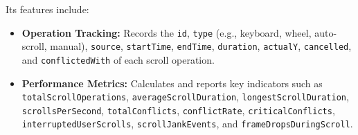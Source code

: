 \documentclass[10pt]{article}
\begin{document}
Its features include:
\begin{itemize}
    \item \textbf{Operation Tracking:} Records the \texttt{id}, \texttt{type} 
    (e.g., keyboard, wheel, auto-scroll, manual), \texttt{source}, \texttt{startTime}, 
    \texttt{endTime}, \texttt{duration}, \texttt{actualY}, \texttt{cancelled}, 
    and \texttt{conflictedWith} of each scroll operation.
    
    \item \textbf{Performance Metrics:} Calculates and reports key indicators such as 
    \texttt{totalScrollOperations}, \texttt{averageScrollDuration}, \linebreak[4] 
    \texttt{longestScrollDuration}, \texttt{scrollsPerSecond}, \texttt{totalConflicts}, 
    \texttt{conflictRate}, \linebreak[4] 
    \texttt{criticalConflicts}, \linebreak[4] 
    \texttt{interruptedUserScrolls}, \texttt{scrollJankEvents}, and 
    \texttt{frameDropsDuringScroll}.
    

\end{itemize}
\end{document}
